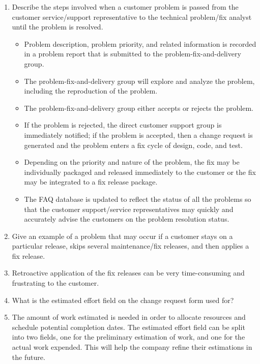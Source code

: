 \documentclass{article}
\begin{document}
\begin{enumerate}
    \item Describe the steps involved when a customer problem is passed from the customer service/support representative to the technical problem/fix analyst until the problem is resolved.
    \begin{itemize}
        \item Problem description, problem priority, and related information is recorded in a problem report that is submitted to the problem-fix-and-delivery group.
        \item The problem-fix-and-delivery group will explore and analyze the problem, including the reproduction of the problem.
        \item The problem-fix-and-delivery group either accepts or rejects the problem.
        \item If the problem is rejected, the direct customer support group is immediately notified; if the problem is accepted, then a change request is generated and the problem enters a fix cycle of design, code, and test.
        \item Depending on the priority and nature of the problem, the fix may be individually packaged and released immediately to the customer or the fix may be integrated to a fix release package. 
        \item The FAQ database is updated to reflect the status of all the problems so that the customer support/service representatives may quickly and accurately advise the customers on the problem resolution status.
    \end{itemize}
    
    \item Give an example of a problem that may occur if a customer stays on a particular release, skips several maintenance/fix releases, and then applies a fix release.
    \item[] Retroactive application of the fix releases can be very time-consuming and frustrating to the customer.
    
    \item What is the estimated effort field on the change request form used for?
    \item[] The amount of work estimated is needed in order to allocate resources and schedule potential completion dates. The estimated effort field can be split into two fields, one for the preliminary estimation of work, and one for the actual work expended. This will help the company refine their estimations in the future.
    
\end{enumerate}
\end{document}
